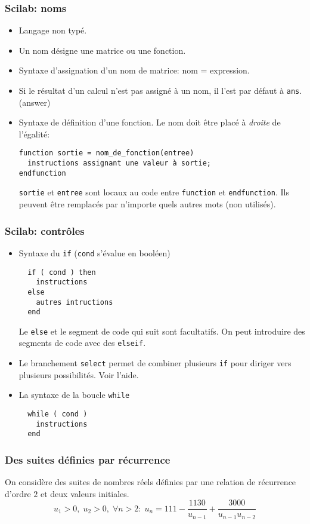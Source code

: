 \begin{frame}[fragile]
  \frametitle{Scilab: noms}
\begin{itemize}
  \item Langage non typé.
  \item Un nom désigne une matrice ou une fonction.
  \item Syntaxe d'assignation d'un nom de matrice: nom = expression.
  \item Si le résultat d'un calcul n'est pas assigné à un nom, il l'est par défaut à \texttt{ans}. (answer)
  \item Syntaxe de définition d'une fonction. Le nom doit être placé à \emph{droite} de l'égalité:
\begin{verbatim}
function sortie = nom_de_fonction(entree)
  instructions assignant une valeur à sortie;
endfunction
\end{verbatim}
\texttt{sortie} et \texttt{entree} sont locaux au code entre \texttt{function} et \texttt{endfunction}. Ils peuvent être remplacés par n'importe quels autres mots (non utilisés).
\end{itemize}
\end{frame}

\begin{frame}[fragile]
  \frametitle{Scilab: contrôles}
\begin{itemize}
  \item Syntaxe du \texttt{if} (\texttt{cond} s'évalue en booléen)
\begin{verbatim}
  if ( cond ) then
    instructions
  else
    autres intructions
  end
\end{verbatim}
Le \texttt{else} et le segment de code qui suit sont facultatifs. On peut introduire des segments de code avec des \texttt{elseif}.

\item Le branchement \texttt{select} permet de combiner plusieurs \texttt{if} pour diriger vers plusieurs possibilités. Voir l'aide.

\item La syntaxe de la boucle \texttt{while} 
\begin{verbatim}
  while ( cond )
    instructions
  end
\end{verbatim}
\end{itemize}
\end{frame}

\begin{frame}
  \frametitle{Des suites définies par récurrence}
On considère des suites de nombres réels définies par une relation de récurrence d'ordre $2$ et deux valeurs initiales.
\begin{displaymath}
  u_1>0,\; u_2>0,\;
  \forall n>2:\;
  u_{n}= 111 - \frac{1130}{u_{n-1}} + \frac{3000}{u_{n-1}u_{n-2}}
\end{displaymath}
\end{frame}

